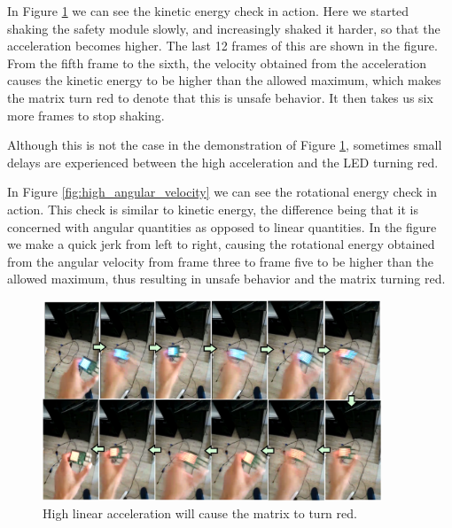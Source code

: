 \documentclass[12pt]{scrreprt}
\begin{document}
\par
In Figure \ref{fig:high_linear_acceleration} we can see the kinetic energy check in action. Here we started shaking the safety module slowly, and increasingly shaked it harder, so that the acceleration becomes higher. The last 12 frames of this are shown in the figure. From the fifth frame to the sixth, the velocity obtained from the acceleration causes the kinetic energy to be higher than the allowed maximum, which makes the matrix turn red to denote that this is unsafe behavior. It then takes us six more frames to stop shaking.
\par
Although this is not the case in the demonstration of Figure \ref{fig:high_linear_acceleration}, sometimes small delays are experienced between the high acceleration and the LED turning red.
\par
In Figure \ref{fig:high_angular_velocity} we can see the rotational energy check in action. This check is similar to kinetic energy, the difference being that it is concerned with angular quantities as opposed to linear quantities. In the figure we make a quick jerk from left to right, causing the rotational energy obtained from the angular velocity from frame three to frame five to be higher than the allowed maximum, thus resulting in unsafe behavior and the matrix turning red.

\begin{figure}[H]
    \centering
    \includegraphics[width=0.9\textwidth]{Figures/results/lighting_leds/linear_acceleration.png}
    \caption{High linear acceleration will cause the matrix to turn red.}
    \label{fig:high_linear_acceleration}
\end{figure}
\end{document}
